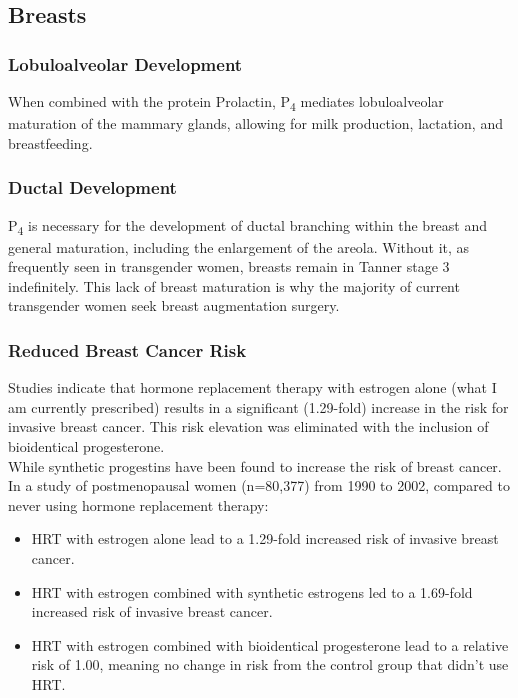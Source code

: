 \documentclass[
	secnumdepth=3, %
]{kaohandt}
\newcommand\tsub[1]{\textsubscript{#1}}
\begin{document}
\subsection{Breasts}

\subsubsection{Lobuloalveolar Development}
When combined with the protein Prolactin, P\tsub{4} mediates lobuloalveolar maturation of the mammary glands, allowing for milk production, lactation, and breastfeeding.

\subsubsection{Ductal Development}
P\tsub{4} is necessary for the development of ductal branching within the breast and general maturation, including the enlargement of the areola. Without it, as frequently seen in transgender women, breasts remain in Tanner stage 3 indefinitely. This lack of breast maturation is why the majority of current transgender women seek breast augmentation surgery.

\subsubsection{Reduced Breast Cancer Risk}
Studies indicate that hormone replacement therapy with estrogen alone (what I am currently prescribed) results in a significant (1.29-fold) increase in the risk for invasive breast cancer. This risk elevation was eliminated with the inclusion of bioidentical progesterone.\\

\noindent While synthetic progestins have been found to increase the risk of breast cancer. In a study of postmenopausal women (n=80,377) from 1990 to 2002, compared to never using hormone replacement therapy:
\begin{itemize}
    \item HRT with estrogen alone lead to a 1.29-fold increased risk of invasive breast cancer.
    \item HRT with estrogen combined with synthetic estrogens led to a 1.69-fold increased risk of invasive breast cancer.
    \item HRT with estrogen combined with bioidentical progesterone lead to a relative risk of 1.00, meaning no change in risk from the control group that didn't use HRT.
\end{itemize}
\end{document}
